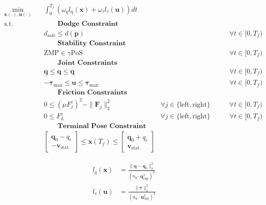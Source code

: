 \begin{subequations}
  \label{eq:bipedal:constraints}
  \begin{align}
    \min_{\bm x(\cdot),\bm u(\cdot)} \quad & \int_0^{T_f} \left(\omega_q l_\text{q}(\bm x) + \omega_\tau l_\tau(\bm{u}) \right) dt \label{bipedal:constraints:obj} \\
    \textrm{s.t.} \quad & \qquad \textbf{Dodge Constraint} \nonumber \\
    & d_\text{safe} \leq d(\bm p) & & \forall t \in [0,T_f) \label{eq:bipedal:constraints:dodge} \\
    & \qquad \textbf{Stability Constraint} \nonumber \\
    & \text{ZMP} \in \gamma \text{PoS} & & \forall t \in [0,T_f) \label{eq:bipedal:constraints:stability} \\
    & \qquad \textbf{Joint Constraints} \nonumber \\
    & \bm{\underline q} \leq \bm{q} \leq \bm{\overline q} & & \forall t \in [0,T_f) \label{eq:bipedal:constraints:joint}\\
    & -\bm{\tau}_\text{max} \leq \bm u \leq \bm{\tau}_\text{max} & & \forall t \in [0,T_f)\label{eq:bipedal:constraints:torque}\\
    & \qquad \textbf{Friction Constraints} \nonumber \\
    & 0 \leq (\mu F_j^z)^2-\|\bm{F}_j\|^2_2 & \forall j \in \{ \text{left}, \text{right} \} \qquad & \forall t \in [0,T_f) \label{eq:bipedal:constraints:F} \\
    & 0 \leq F_L^z & \forall j \in \{ \text{left}, \text{right} \} \qquad & \forall t \in [0,T_f) \label{eq:bipedal:constraints:Fz} \\
    & \qquad \textbf{Terminal Pose Constraint} \nonumber \\
    & \begin{bmatrix} \bm q_0-q_\epsilon \\ -\bm v_\text{stat.} \end{bmatrix}
    \leq \bm x(T_f) \leq
    \begin{bmatrix} \bm q_0+q_\epsilon \\ \bm v_\text{stat.} \end{bmatrix} \label{eq:bipedal:constraints:terminal}
  \end{align}
\end{subequations}

\begin{subequations}
  \label{eq:bipedal:obj}
  \begin{align}
    l_q(\bm x) &= \frac{\| \bm q-\bm q_0 \|^2_2}{(n_q \cdot \bm{q}_\text{exp}^2)^2}  \label{eq:bipedal:obj:joint} \\
    l_\tau(\bm u) &= \frac{\|\bm{\tau}\|^2_2}{(n_u \cdot \bm{u}_\text{exp}^2)^2} \label{eq:bipedal:obj:torque}
  \end{align}
\end{subequations}

